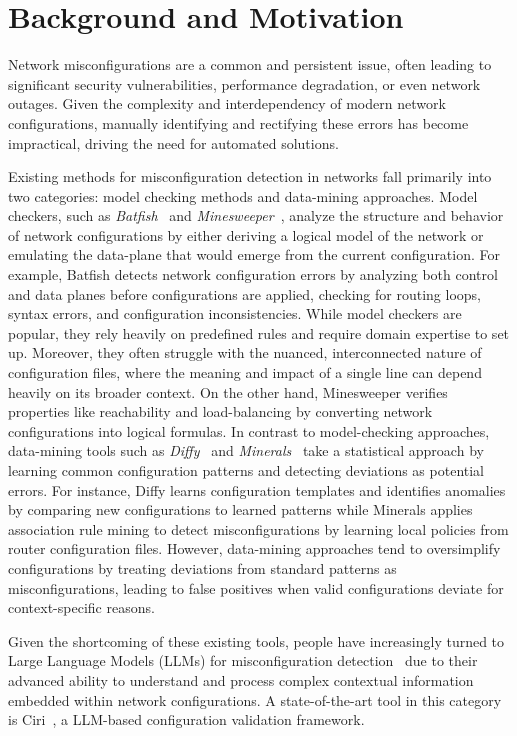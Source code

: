 \section{Background and Motivation}
\label{sec_background}
Network misconfigurations are a common and persistent issue, often leading to significant security vulnerabilities, performance degradation, or even network outages. Given the complexity and interdependency of modern network configurations, manually identifying and rectifying these errors has become impractical, driving the need for automated solutions.

Existing methods for misconfiguration detection in networks fall primarily into two categories: model checking methods and data-mining approaches. Model checkers, such as \textit{Batfish}~\cite{fogel2015general} and \textit{Minesweeper}~\cite{beckett2017general}, analyze the structure and behavior of network configurations by either deriving a logical model of the network or emulating the data-plane that would emerge from the current configuration.
For example, Batfish detects network configuration errors by analyzing both control and data planes before configurations are applied, checking for routing loops, syntax errors, and configuration inconsistencies. While model checkers are popular, they rely heavily on predefined rules and require domain expertise to set up. Moreover, they often struggle with the nuanced, interconnected nature of configuration files, where the meaning and impact of a single line can depend heavily on its broader context.
On the other hand, Minesweeper verifies properties like reachability and load-balancing by converting network configurations into logical formulas.
In contrast to model-checking approaches, data-mining tools such as \textit{Diffy}~\cite{kakarla2024diffy} and \textit{Minerals}~\cite{le2006minerals} take a statistical approach by learning common configuration patterns and detecting deviations as potential errors.
For instance, Diffy learns configuration templates and identifies anomalies by comparing new configurations to learned patterns while Minerals applies association rule mining to detect misconfigurations by learning local policies from router configuration files. However, data-mining approaches tend to oversimplify configurations by treating deviations from standard patterns as misconfigurations, leading to false positives when valid configurations deviate for context-specific reasons.


Given the shortcoming of these existing tools,
people have increasingly turned to Large Language Models (LLMs) for misconfiguration detection~\cite{bogdanov2024leveraging,chen2024automatic,wang2024identifying,liu2024large, wang2024netconfeval} due to their advanced ability to understand and process complex contextual information embedded within network configurations. A state-of-the-art tool in this category is Ciri~\cite{lian2023configuration}, a LLM-based configuration validation framework.

